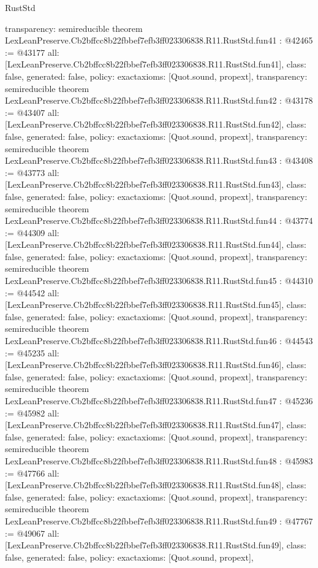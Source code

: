 \begin{lexlean}{RustStd}
\begin{coremodule}
{  transparency: semireducible
}
theorem LexLeanPreserve.Cb2bffcc8b22fbbef7efb3ff023306838.R11.RustStd.fun41 : @42465 := @43177 {
  all: [LexLeanPreserve.Cb2bffcc8b22fbbef7efb3ff023306838.R11.RustStd.fun41],
  class: false,
  generated: false,
  policy: exact{axioms: [Quot.sound, propext]},
  transparency: semireducible
}
theorem LexLeanPreserve.Cb2bffcc8b22fbbef7efb3ff023306838.R11.RustStd.fun42 : @43178 := @43407 {
  all: [LexLeanPreserve.Cb2bffcc8b22fbbef7efb3ff023306838.R11.RustStd.fun42],
  class: false,
  generated: false,
  policy: exact{axioms: [Quot.sound, propext]},
  transparency: semireducible
}
theorem LexLeanPreserve.Cb2bffcc8b22fbbef7efb3ff023306838.R11.RustStd.fun43 : @43408 := @43773 {
  all: [LexLeanPreserve.Cb2bffcc8b22fbbef7efb3ff023306838.R11.RustStd.fun43],
  class: false,
  generated: false,
  policy: exact{axioms: [Quot.sound, propext]},
  transparency: semireducible
}
theorem LexLeanPreserve.Cb2bffcc8b22fbbef7efb3ff023306838.R11.RustStd.fun44 : @43774 := @44309 {
  all: [LexLeanPreserve.Cb2bffcc8b22fbbef7efb3ff023306838.R11.RustStd.fun44],
  class: false,
  generated: false,
  policy: exact{axioms: [Quot.sound, propext]},
  transparency: semireducible
}
theorem LexLeanPreserve.Cb2bffcc8b22fbbef7efb3ff023306838.R11.RustStd.fun45 : @44310 := @44542 {
  all: [LexLeanPreserve.Cb2bffcc8b22fbbef7efb3ff023306838.R11.RustStd.fun45],
  class: false,
  generated: false,
  policy: exact{axioms: [Quot.sound, propext]},
  transparency: semireducible
}
theorem LexLeanPreserve.Cb2bffcc8b22fbbef7efb3ff023306838.R11.RustStd.fun46 : @44543 := @45235 {
  all: [LexLeanPreserve.Cb2bffcc8b22fbbef7efb3ff023306838.R11.RustStd.fun46],
  class: false,
  generated: false,
  policy: exact{axioms: [Quot.sound, propext]},
  transparency: semireducible
}
theorem LexLeanPreserve.Cb2bffcc8b22fbbef7efb3ff023306838.R11.RustStd.fun47 : @45236 := @45982 {
  all: [LexLeanPreserve.Cb2bffcc8b22fbbef7efb3ff023306838.R11.RustStd.fun47],
  class: false,
  generated: false,
  policy: exact{axioms: [Quot.sound, propext]},
  transparency: semireducible
}
theorem LexLeanPreserve.Cb2bffcc8b22fbbef7efb3ff023306838.R11.RustStd.fun48 : @45983 := @47766 {
  all: [LexLeanPreserve.Cb2bffcc8b22fbbef7efb3ff023306838.R11.RustStd.fun48],
  class: false,
  generated: false,
  policy: exact{axioms: [Quot.sound, propext]},
  transparency: semireducible
}
theorem LexLeanPreserve.Cb2bffcc8b22fbbef7efb3ff023306838.R11.RustStd.fun49 : @47767 := @49067 {
  all: [LexLeanPreserve.Cb2bffcc8b22fbbef7efb3ff023306838.R11.RustStd.fun49],
  class: false,
  generated: false,
  policy: exact{axioms: [Quot.sound, propext]},
}
\end{coremodule}
\end{lexlean}
